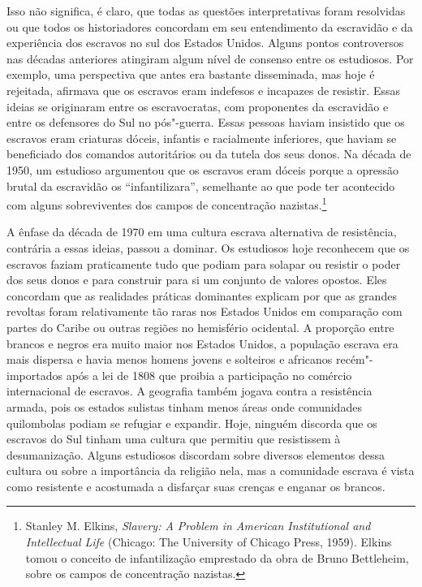 Isso não significa, é claro, que todas as questões interpretativas foram
resolvidas ou que todos os historiadores concordam em seu entendimento
da escravidão e da experiência dos escravos no sul dos Estados Unidos.
Alguns pontos controversos nas décadas anteriores atingiram algum nível
de consenso entre os estudiosos. Por exemplo, uma perspectiva que antes
era bastante disseminada, mas hoje é rejeitada, afirmava que os escravos
eram indefesos e incapazes de resistir. Essas ideias se originaram entre
os escravocratas, com proponentes da escravidão e entre os defensores do
Sul no pós"-guerra. Essas pessoas haviam insistido que os escravos eram
criaturas dóceis, infantis e racialmente inferiores, que haviam se
beneficiado dos comandos autoritários ou da tutela dos seus donos. Na
década de 1950, um estudioso argumentou que os escravos eram dóceis
porque a opressão brutal da escravidão os ``infantilizara'', semelhante
ao que pode ter acontecido com alguns sobreviventes dos campos de
concentração nazistas.\footnote{Stanley M. Elkins, \emph{Slavery: A
  Problem in American Institutional and Intellectual Life} (Chicago: The
  University of Chicago Press, 1959). Elkins tomou o conceito de
  infantilização emprestado da obra de Bruno Bettleheim, sobre os campos
  de concentração nazistas.}

A ênfase da década de 1970 em uma cultura escrava alternativa de
resistência, contrária a essas ideias, passou a dominar. Os estudiosos
hoje reconhecem que os escravos faziam praticamente tudo que podiam para
solapar ou resistir o poder dos seus donos e para construir para si um
conjunto de valores opostos. Eles concordam que as realidades práticas
dominantes explicam por que as grandes revoltas foram relativamente tão
raras nos Estados Unidos em comparação com partes do Caribe ou outras
regiões no hemisfério ocidental. A proporção entre brancos e negros era
muito maior nos Estados Unidos, a população escrava era mais dispersa e
havia menos homens jovens e solteiros e africanos recém"-importados após
a lei de 1808 que proibia a participação no comércio internacional de
escravos. A geografia também jogava contra a resistência armada, pois os
estados sulistas tinham menos áreas onde comunidades quilombolas podiam
se refugiar e expandir. Hoje, ninguém discorda que os escravos do Sul
tinham uma cultura que permitiu que resistissem à desumanização. Alguns
estudiosos discordam sobre diversos elementos dessa cultura ou sobre a
importância da religião nela, mas a comunidade escrava é vista como
resistente e acostumada a disfarçar suas crenças e enganar os brancos.

